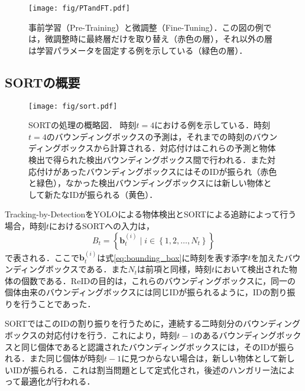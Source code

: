         \begin{figure}[t]
            \centering    
            \texttt{[image: fig/PTandFT.pdf]}
            \caption[事前学習（Pre-Training）と微調整（Fine-Tuning）]{事前学習（Pre-Training）と微調整（Fine-Tuning）．この図の例では，微調整時に最終層だけを取り替え（赤色の層），それ以外の層は学習パラメータを固定する例を示している（緑色の層）．}
            \label{fig:PTandFT}
        \end{figure}

    \subsection{SORTの概要}
    \label{subsec:abstract_of_sort}

    \begin{figure}[t]
        \centering
        \texttt{[image: fig/sort.pdf]}
        \caption[SORTの処理の概略図]{SORTの処理の概略図．
        時刻$t=4$における例を示している．時刻$t=4$のバウンディングボックスの予測は，それまでの時刻のバウンディングボックスから計算される．対応付けはこれらの予測と物体検出で得られた検出バウンディングボックス間で行われる．また対応付けがあったバウンディングボックスにはそのIDが振られ（赤色と緑色），なかった検出バウンディングボックスには新しい物体として新たなIDが振られる（黄色）．}
        \label{fig:sort}
    \end{figure}

    Tracking-by-DetectionをYOLOによる物体検出とSORTによる追跡によって行う場合，時刻$t$におけるSORTへの入力は，
    \begin{equation}
        \label{eq:input_to_sort}
        B_t = \left\{\bm{b}_t^{(i)} \mid i \in \left\{1 ,2, \dots, N_t\right\}\right\}
    \end{equation}
    で表される．ここで$\bm{b}_t^{(i)}$は式\ref{eq:bounding_box}に時刻を表す添字$t$を加えたバウンディングボックスである．また$N_t$は前項と同様，時刻$t$において検出された物体の個数である．ReIDの目的は，これらのバウンディングボックスに，同一の個体由来のバウンディングボックスには同じIDが振られるように，IDの割り振りを行うことであった．

    SORTではこのIDの割り振りを行うために，連続する二時刻分のバウンディングボックスの対応付けを行う．これにより，時刻$t-1$のあるバウンディングボックスと同じ個体であると認識されたバウンディングボックスには，そのIDが振られる．また同じ個体が時刻$t-1$に見つからない場合は，新しい物体として新しいIDが振られる．これは割当問題として定式化され，後述のハンガリー法によって最適化が行われる．

